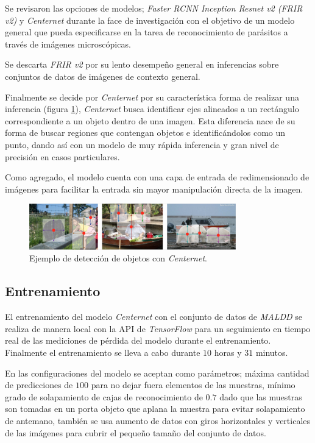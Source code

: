 \documentclass[letter,12pt]{report}
\begin{document}
Se revisaron las opciones de modelos; \textit{Faster RCNN Inception Resnet v2 (FRIR v2)} y
\textit{Centernet} durante la face de investigación con el objetivo de un modelo general que
pueda especificarse en la tarea de reconocimiento de parásitos a través de imágenes
microscópicas.

Se descarta \textit{FRIR v2} por su lento desempeño general en inferencias sobre conjuntos
de datos de imágenes de contexto general.

Finalmente se decide por \textit{Centernet} por su característica forma de realizar una
inferencia (figura \ref{fig:centernet}), \textit{Centernet} busca identificar ejes alineados a un rectángulo
correspondiente a un objeto dentro de una imagen. Esta diferencia nace de su forma de 
buscar regiones que contengan objetos e identificándolos como un punto, dando así con un
modelo de muy rápida inferencia y gran nivel de precisión en casos particulares.

Como agregado, el modelo cuenta con una capa de entrada de redimensionado de imágenes para
facilitar la entrada sin mayor manipulación directa de la imagen.

\begin{figure}[ht]
    \centering
    \includegraphics[width=0.8\textwidth]{centernet}
    \caption{Ejemplo de detección de objetos con \textit{Centernet}.}
    \label{fig:centernet}
\end{figure}

\subsection{Entrenamiento}
El entrenamiento del modelo \textit{Centernet} con el conjunto de datos de \textit{MALDD} se
realiza de manera local con la API de \textit{TensorFlow} para un seguimiento en tiempo real
de las mediciones de pérdida del modelo durante el entrenamiento. Finalmente el
entrenamiento se lleva a cabo durante $10$ horas y $31$ minutos.

En las configuraciones del modelo se aceptan como parámetros; máxima cantidad de predicciones
de $100$ para no dejar fuera elementos de las muestras, mínimo grado de solapamiento de cajas
de reconocimiento de $0.7$ dado que las muestras son tomadas en un porta objeto que aplana
la muestra para evitar solapamiento de antemano, también se usa aumento de datos con giros
horizontales y verticales de las imágenes para cubrir el pequeño tamaño del conjunto de datos.
\end{document}
